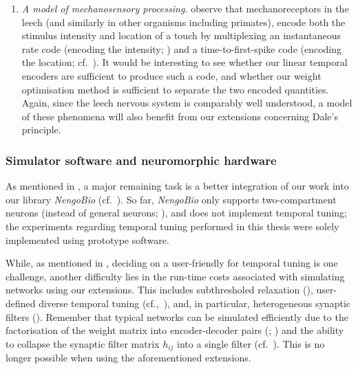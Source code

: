 \begin{enumerate}[1.]
	\item \emph{A model of mechanosensory processing.}
	 observe that mechanoreceptors in the leech (and similarly in other organisms including primates), encode both the stimulus intensity and location of a touch by multiplexing an instantaneous rate code (encoding the intensity; ) and a time-to-first-spike code (encoding the location; cf.~).
	It would be interesting to see whether our linear temporal encoders are sufficient to produce such a code, and whether our weight optimisation method is sufficient to separate the two encoded quantities.
	Again, since the leech nervous system is comparably well understood, a model of these phenomena will also benefit from our extensions concerning Dale's principle.
\end{enumerate}

\subsubsection{Simulator software and neuromorphic hardware}

As mentioned in , a major remaining task is a better integration of our work into our library \emph{NengoBio} (cf.~).
So far, \emph{NengoBio} only supports two-compartment \LIF neurons (instead of general \nlif neurons; ), and does not implement temporal tuning; the experiments regarding temporal tuning performed in this thesis were solely implemented using prototype software.

While, as mentioned in , deciding on a user-friendly \API for temporal tuning is one challenge, another difficulty lies in the run-time costs associated with simulating networks using our extensions.
This includes subthresholed relaxation (), user-defined diverse temporal tuning (cf.,~), and, in particular, heterogeneous synaptic filters ().
Remember that typical \NEF networks can be simulated efficiently due to the factorisation of the weight matrix into encoder-decoder pairs (; \cite{bekolay2014nengo}) and the ability to collapse the synaptic filter matrix $h_{ij}$ into a single filter (cf.~).
This is no longer possible when using the aforementioned extensions.


